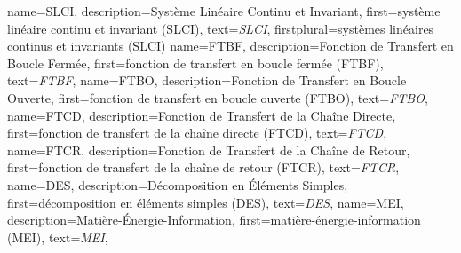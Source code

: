 {%
  name={SLCI},%
  description={Système Linéaire Continu et Invariant},%
  first={système\- lin\-éaire\- con\-tinu\- et\- in\-va\-riant\- (SLCI)},%
  text={\emph{{\scshape SLCI}}},%
  firstplural={systèmes\- linéaires\- continus\- et\- invariants\- (SLCI)}%
}
{%
  name={FTBF},%
  description={Fonction de Transfert en Boucle Fermée},%
  first={fonction de transfert en boucle fermée (FTBF)},%
  text={\emph{{\scshape FTBF}}},%
}
{%
  name={FTBO},%
  description={Fonction de Transfert en Boucle Ouverte},%
  first={fonction de transfert en boucle ouverte (FTBO)},%
  text={\emph{{\scshape FTBO}}},%
}
{%
  name={FTCD},%
  description={Fonction de Transfert de la Chaîne Directe},%
  first={fonction de transfert de la chaîne directe (FTCD)},%
  text={\emph{{\scshape FTCD}}},%
}
{%
  name={FTCR},%
  description={Fonction de Transfert de la Chaîne de Retour},%
  first={fonction de transfert de la chaîne de retour (FTCR)},%
  text={\emph{{\scshape FTCR}}},%
}
{%
  name={DES},%
  description={Décomposition en \'Eléments Simples},%
  first={décomposition en éléments simples (DES)},%
  text={\emph{{\scshape DES}}},%
}
{%
  name={MEI},%
  description={Matière-\'Energie-Information},%
  first={matière-énergie-information (MEI)},%
  text={\emph{{\scshape MEI}}},%
}
